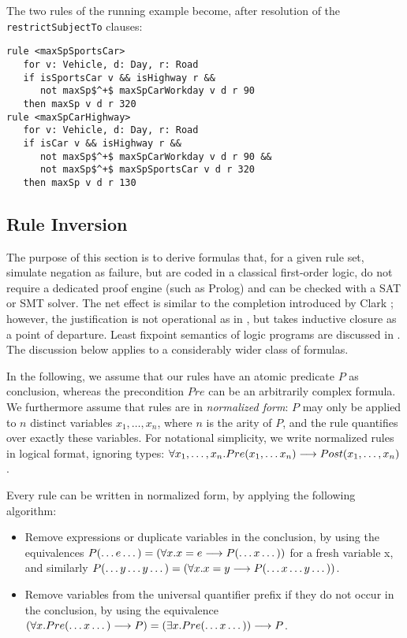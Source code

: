 \begin{example} The two rules of the running example become, after resolution
  of the \texttt{restrictSubjectTo} clauses:
\begin{lstlisting}[mathescape=true]
rule <maxSpSportsCar>
   for v: Vehicle, d: Day, r: Road
   if isSportsCar v && isHighway r &&
      not maxSp$^+$ maxSpCarWorkday v d r 90
   then maxSp v d r 320
rule <maxSpCarHighway>
   for v: Vehicle, d: Day, r: Road
   if isCar v && isHighway r &&
      not maxSp$^+$ maxSpCarWorkday v d r 90 &&
      not maxSp$^+$ maxSpSportsCar v d r 320
   then maxSp v d r 130
\end{lstlisting}
\end{example}

\subsection{Rule Inversion}\label{sec:rule_inversion}

The purpose of this section is to derive formulas that, for a given rule set,
simulate negation as failure, but are coded in a classical first-order logic,
do not require a dedicated proof engine (such as Prolog) and can be checked
with a SAT or SMT solver. The net effect is similar to the completion
introduced by Clark \cite{clark_NegAsFailure_1978}; however, the justification
is not operational as in \cite{clark_NegAsFailure_1978}, but takes 
inductive closure as a point of departure. Least fixpoint semantics of logic programs are discussed in  \cite{falaschi_etal_declarative_logic_langauges_1989,fages_consistency_clark_completion_1994}.
The discussion below applies to a considerably wider class of formulas.

In the following, we assume that our rules have an atomic predicate $P$ as
conclusion, whereas the precondition $Pre$ can be an arbitrarily complex
formula.  We furthermore assume that rules are in \emph{normalized form}: $P$
may only be applied to $n$ distinct variables $x_1, \dots, x_n$, where $n$ is
the arity of $P$, and the rule quantifies over exactly these variables.
For notational simplicity, we write normalized rules in logical format,
ignoring types:
$\forall x_1, \dots, x_n. Pre(x_1, \dots x_n) \longrightarrow Post(x_1, \dots, x_n)$.

Every rule can be written in normalized form, by applying the following
algorithm:
\begin{itemize}
\item Remove expressions or duplicate variables in the conclusion, by using
  the equivalences $P(\dots e \dots) = (\forall x. x = e \longrightarrow P(\dots x
  \dots))$ for a fresh variable x, and similarly $P(\dots y \dots y \dots) =
  (\forall x. x = y   \longrightarrow P(\dots x \dots y \dots))$.
\item Remove variables from the universal quantifier prefix if they do not
  occur in the conclusion, by using the equivalence
  $(\forall x. Pre(\dots x \dots) \longrightarrow P) = (\exists x. Pre(\dots x \dots))
  \longrightarrow P$.
\end{itemize}

